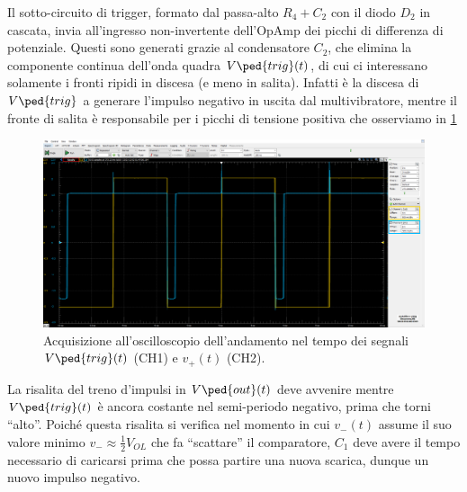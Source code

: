 \documentclass[10pt, a4paper, italian]{article}
\begin{document}
Il sotto-circuito di trigger, formato dal passa-alto $R_4 + C_2$ con il diodo
$D_2$ in cascata, invia all'ingresso non-invertente dell'OpAmp dei picchi di
differenza di potenziale. Questi sono generati grazie al condensatore $C_2$, 
che elimina la componente continua dell'onda quadra $V\ped{trig} (t)$, di cui
ci interessano solamente i fronti ripidi in discesa (e meno in salita).
Infatti è la discesa di $V\ped{trig}$ a generare l'impulso negativo in uscita
dal multivibratore, mentre il fronte di salita è responsabile per i picchi di
tensione positiva che osserviamo in \cref{fig: mstabilev+vtrig}
\begin{figure}[htbp]
\centering
\includegraphics[scale=0.335]{mstablev+vtrig}
\caption{Acquisizione all'oscilloscopio dell'andamento nel tempo dei
segnali $V\ped{trig} (t)$ (CH1) e $v_+ (t)$ (CH2).
\label{fig: mstabilev+vtrig}}
\end{figure}

La risalita del treno d'impulsi in $V\ped{out} (t)$ deve avvenire mentre
$V\ped{trig} (t)$ è ancora costante nel semi-periodo negativo, prima che torni
``alto''. Poiché questa risalita si verifica nel momento in cui $v_- (t)$
assume il suo valore minimo $v_- \approx \frac{1}{2} V_{OL}$ che fa
``scattare'' il comparatore, $C_1$ deve avere il tempo necessario di caricarsi
prima che possa partire una nuova scarica, dunque un nuovo impulso negativo.
\end{document}

